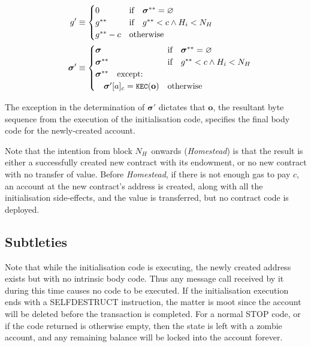 \documentclass[9pt,oneside]{amsart}
\newcommand{\firsthomesteadblock}{\ensuremath{N_H}}
\begin{document}
\begin{multicols}{2}
\begin{align}
\quad g' &\equiv \begin{cases}
0 & \text{if} \quad \boldsymbol{\sigma}^{**} = \varnothing \\
g^{**} & \text{if} \quad g^{**}<c \wedge H_i<\firsthomesteadblock \\
g^{**} - c & \text{otherwise} \\
\end{cases} \\
\quad \boldsymbol{\sigma}' &\equiv  \begin{cases}
\boldsymbol{\sigma} & \text{if} \quad \boldsymbol{\sigma}^{**} = \varnothing \\
\boldsymbol{\sigma}^{**} & \text{if} \quad g^{**}<c \wedge H_i<\firsthomesteadblock \\
\boldsymbol{\sigma}^{**} \quad \text{except:} & \\
\quad\boldsymbol{\sigma}'[a]_c = \texttt{\small KEC}(\mathbf{o}) & \text{otherwise}
\end{cases}
\end{align}

The exception in the determination of $\boldsymbol{\sigma}'$ dictates that $\mathbf{o}$, the resultant byte sequence from the execution of the initialisation code, specifies the final body code for the newly-created account.

Note that the intention from block \firsthomesteadblock\ onwards ({\it Homestead}) is that the result is either a successfully created new contract with its endowment, or no new contract with no transfer of value. Before {\it Homestead}, if there is not enough gas to pay $c$, an account at the new contract's address is created, along with all the initialisation side-effects, and the value is transferred, but no contract code is deployed.

\subsection{Subtleties}
Note that while the initialisation code is executing, the newly created address exists but with no intrinsic body code. Thus any message call received by it during this time causes no code to be executed. If the initialisation execution ends with a {\small SELFDESTRUCT} instruction, the matter is moot since the account will be deleted before the transaction is completed. For a normal {\small STOP} code, or if the code returned is otherwise empty, then the state is left with a zombie account, and any remaining balance will be locked into the account forever.


\end{multicols}
\end{document}
